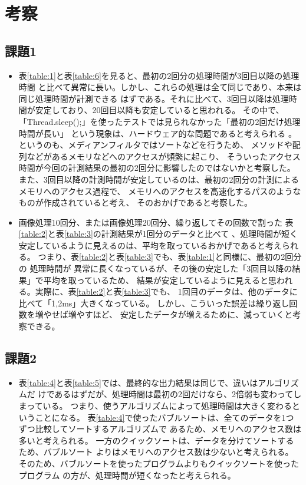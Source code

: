 \section{考察}
\subsection{課題1}
\begin{itemize}
  \item 表\ref{table:1}と表\ref{table:6}を見ると、最初の2回分の処理時間が3回目以降の処理時間
  と比べて異常に長い。しかし、これらの処理は全て同じであり、本来は同じ処理時間が計測できる
  はずである。それに比べて、3回目以降は処理時間が安定しており、20回目以降も安定していると思われる。
  その中で、「Thread.sleep();」を使ったテストでは見られなかった「最初の2回だけ処理時間が長い」
  という現象は、ハードウェア的な問題であると考えられる
  。というのも、メディアンフィルタではソートなどを行うため、
  メソッドや配列などがあるメモリなどへのアクセスが頻繁に起こり、
  そういったアクセス時間が今回の計測結果の最初の2回分に影響したのではないかと考察した。
  また、3回目以降の計測時間が安定しているのは、最初の2回分の計測によるメモリへのアクセス過程で、
  メモリへのアクセスを高速化するパスのようなものが作成されていると考え、
  そのおかげであると考察した。
  \item 画像処理10回分、または画像処理20回分、繰り返してその回数で割った
  表\ref{table:2}と表\ref{table:3}の計測結果が1回分のデータと比べて
  、処理時間が短く安定しているように見えるのは、平均を取っているおかげであると考えられる。
  つまり、表\ref{table:2}と表\ref{table:3}でも、表\ref{table:1}と同様に、最初の2回分の
  処理時間が  異常に長くなっているが、その後の安定した「3回目以降の結果」で平均を取っているため、
  結果が安定しているように見えると思われる。実際に、表\ref{table:2}と表\ref{table:3}でも、
  1回目のデータは、他のデータに比べて「1,2ms」大きくなっている。
  しかし、こういった誤差は繰り返し回数を増やせば増やすほど、
  安定したデータが増えるために、減っていくと考察できる。
\end{itemize}

\subsection{課題2}
\begin{itemize}
  \item 表\ref{table:4}と表\ref{table:5}では、最終的な出力結果は同じで、違いはアルゴリズムだ
  けであるはずだが、処理時間は最初の2回だけなら、2倍弱も変わってしまっている。
  つまり、使うアルゴリズムによって処理時間は大きく変わるということになる。
  表\ref{table:4}で使ったバブルソートは、全てのデータを1つずつ比較してソートするアルゴリズムで
  あるため、メモリへのアクセス数は多いと考えられる。
  一方のクイックソートは、データを分けてソートするため、バブルソート
  よりはメモリへのアクセス数は少ないと考えられる。
  そのため、バブルソートを使ったプログラムよりもクイックソートを使ったプログラム
  の方が、処理時間が短くなったと考えられる。
\end{itemize}